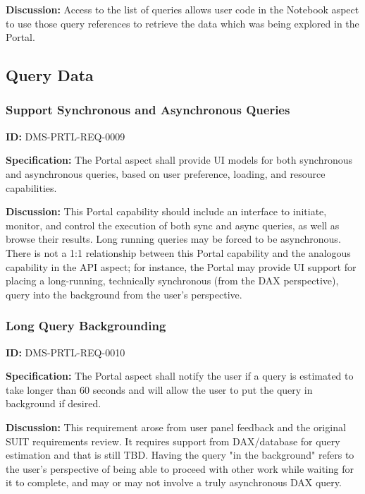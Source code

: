 \documentclass[SE,toc]{lsstdoc}
\begin{document}
\textbf{Discussion:}
Access to the list of queries allows user code in the Notebook aspect to use those query references to retrieve the data which was being explored in the Portal.

\subsection{Query Data}

\subsubsection{Support Synchronous and Asynchronous Queries}

\label{DMS-PRTL-REQ-0009}
\textbf{ID:} DMS-PRTL-REQ-0009

\textbf{Specification:}
The Portal aspect shall provide UI models for both synchronous and asynchronous queries, based on user preference, loading, and resource capabilities.

\textbf{Discussion:}
This Portal capability should include an interface to initiate, monitor, and control the execution of both sync and async queries, as well as browse their results. Long running queries may be forced to be asynchronous.
There is not a 1:1 relationship between this Portal capability and the analogous capability in the API aspect; for instance, the Portal may provide UI support for placing a long-running, technically synchronous (from the DAX perspective), query into the background from the user's perspective.

\subsubsection{Long Query Backgrounding}

\label{DMS-PRTL-REQ-0010}
\textbf{ID:} DMS-PRTL-REQ-0010

\textbf{Specification:}
The Portal aspect shall notify the user if a query is estimated to take longer than 60 seconds and will allow the user to put the query in background if desired.

\textbf{Discussion:}
This requirement arose from user panel feedback and the original SUIT requirements review.  It requires support from DAX/database for query estimation and that is still TBD.  Having the query "in the background" refers to the user's perspective of being able to proceed with other work while waiting for it to complete, and may or may not involve a truly asynchronous DAX query.
\end{document}
